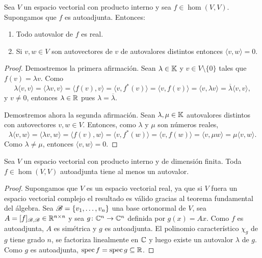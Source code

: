 \begin{prop}
	\label{pro:autoadjunta}
	Sea $V$ un espacio vectorial con producto interno y sea $f\in\hom(V,V)$.
	Supongamos que $f$ es autoadjunta.  Entonces:
	\begin{enumerate}
		\item Todo autovalor de $f$ es real.
		\item Si $v,w\in V$ son autovectores de $v$ de autovalores distintos
			entonces $\langle v,w\rangle=0$.
	\end{enumerate}

	\begin{proof}
		Demostremos la primera afirmación. Sean $\lambda\in\mathbb{K}$ y $v\in
		V\setminus\{0\}$ tales que $f(v)=\lambda v$. Como 
		\[
		\lambda\langle v,v\rangle
		=\langle\lambda v,v\rangle
		=\langle f(v),v\rangle
		=\langle v,f^*(v)\rangle
		=\langle v,f(v)\rangle
		=\langle v,\lambda v\rangle
		=\overline{\lambda}\langle v,v\rangle,
		\]
		y $v\ne 0$, entonces $\lambda\in\mathbb{R}$ pues $\lambda=\overline{\lambda}$. 

		Demostremos ahora la segunda afirmación. Sean $\lambda,\mu\in\mathbb{K}$
		autovalores distintos con autovectores $v,w\in V$. Entonces, como
		$\lambda$ y $\mu$ son números reales, 
		\[
			\lambda\langle v,w\rangle
			=\langle \lambda v,w\rangle
			=\langle f(v),w\rangle
			=\langle v,f^*(w)\rangle
			=\langle v,f(w)\rangle
			=\langle v,\mu w\rangle
			=\mu\langle v,w\rangle.
		\]
		Como $\lambda\ne\mu$, entonces $\langle v,w\rangle=0$.
	\end{proof}
\end{prop}

\begin{prop}
    Sea $V$ un espacio vectorial con producto interno y de dimensión finita.
    Toda $f\in\hom(V,V)$ autoadjunta tiene al menos un autovalor. 

	\begin{proof}
		Supongamos que $V$ es un espacio vectorial real, ya que si $V$ fuera un espacio vectorial complejo el resultado es válido
		gracias al teorema fundamental del álgebra. 
		Sea $\mathscr{B}=\{v_1,\dots,v_n\}$ una base ortonormal de $V$, sea
		$A=[f]_{\mathscr{B},\mathscr{B}}\in\mathbb{R}^{n\times n}$ y sea $g\colon\mathbb{C}^n\to\mathbb{C}^n$ definida por $g(x)=Ax$.
		Como $f$ es autoadjunta, $A$ es simétrica y $g$ es autoadjunta. El polinomio
		característico $\chi_g$ de $g$ tiene grado $n$, se factoriza
		linealmente en $\mathbb{C}$ y luego existe un autovalor $\lambda$ de $g$. Como
		$g$ es autoadjunta, $\operatorname{spec} f=\operatorname{spec} g\subseteq\mathbb{R}$. 
	\end{proof}
\end{prop}

